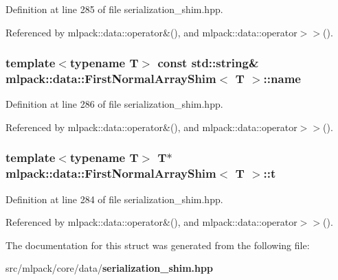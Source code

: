 Definition at line 285 of file serialization\+\_\+shim.\+hpp.



Referenced by mlpack\+::data\+::operator\&(), and mlpack\+::data\+::operator$>$$>$().

\subsubsection[{name}]{\setlength{\rightskip}{0pt plus 5cm}template$<$typename T$>$ const {\bf std\+::string}\& {\bf mlpack\+::data\+::\+First\+Normal\+Array\+Shim}$<$ T $>$\+::name}\label{structmlpack_1_1data_1_1FirstNormalArrayShim_a9238fa4b73eac8e4245fcb546eeb0ac9}


Definition at line 286 of file serialization\+\_\+shim.\+hpp.



Referenced by mlpack\+::data\+::operator\&(), and mlpack\+::data\+::operator$>$$>$().

\subsubsection[{t}]{\setlength{\rightskip}{0pt plus 5cm}template$<$typename T$>$ T$\ast$ {\bf mlpack\+::data\+::\+First\+Normal\+Array\+Shim}$<$ T $>$\+::t}\label{structmlpack_1_1data_1_1FirstNormalArrayShim_a885e1053095f85e3cad274628e428b58}


Definition at line 284 of file serialization\+\_\+shim.\+hpp.



Referenced by mlpack\+::data\+::operator\&(), and mlpack\+::data\+::operator$>$$>$().



The documentation for this struct was generated from the following file\+:\begin{DoxyCompactItemize}
\item 
src/mlpack/core/data/{\bf serialization\+\_\+shim.\+hpp}\end{DoxyCompactItemize}
